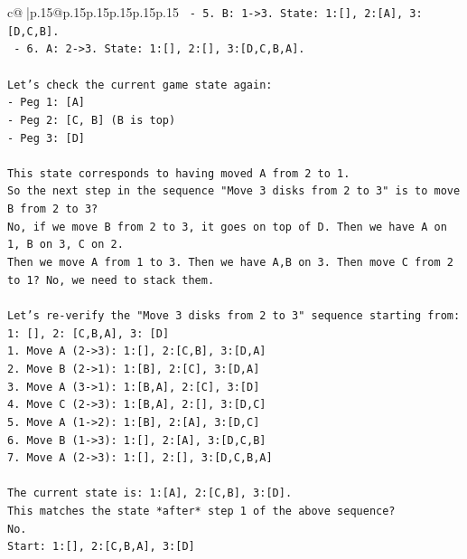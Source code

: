 \documentclass{article}
\begin{document}
{\begin{supertabular}{c@{$\;$}|p{.15\linewidth}@{}p{.15\linewidth}p{.15\linewidth}p{.15\linewidth}p{.15\linewidth}p{.15\linewidth}}
{{{\texttt{   {-} 5. B: 1{-}>3. State: 1:{[}{]}, 2:{[}A{]}, 3:{[}D,C,B{]}.} \\
\texttt{   {-} 6. A: 2{-}>3. State: 1:{[}{]}, 2:{[}{]}, 3:{[}D,C,B,A{]}.} \\
\\ 
\texttt{Let's check the current game state again:} \\
\texttt{{-} Peg 1: {[}A{]}} \\
\texttt{{-} Peg 2: {[}C, B{]} (B is top)} \\
\texttt{{-} Peg 3: {[}D{]}} \\
\\ 
\texttt{This state corresponds to having moved A from 2 to 1.} \\
\texttt{So the next step in the sequence "Move 3 disks from 2 to 3" is to move B from 2 to 3?} \\
\texttt{No, if we move B from 2 to 3, it goes on top of D. Then we have A on 1, B on 3, C on 2.} \\
\texttt{Then we move A from 1 to 3. Then we have A,B on 3. Then move C from 2 to 1? No, we need to stack them.} \\
\\ 
\texttt{Let's re{-}verify the "Move 3 disks from 2 to 3" sequence starting from:} \\
\texttt{1: {[}{]}, 2: {[}C,B,A{]}, 3: {[}D{]}} \\
\texttt{1. Move A (2{-}>3): 1:{[}{]}, 2:{[}C,B{]}, 3:{[}D,A{]}} \\
\texttt{2. Move B (2{-}>1): 1:{[}B{]}, 2:{[}C{]}, 3:{[}D,A{]}} \\
\texttt{3. Move A (3{-}>1): 1:{[}B,A{]}, 2:{[}C{]}, 3:{[}D{]}} \\
\texttt{4. Move C (2{-}>3): 1:{[}B,A{]}, 2:{[}{]}, 3:{[}D,C{]}} \\
\texttt{5. Move A (1{-}>2): 1:{[}B{]}, 2:{[}A{]}, 3:{[}D,C{]}} \\
\texttt{6. Move B (1{-}>3): 1:{[}{]}, 2:{[}A{]}, 3:{[}D,C,B{]}} \\
\texttt{7. Move A (2{-}>3): 1:{[}{]}, 2:{[}{]}, 3:{[}D,C,B,A{]}} \\
\\ 
\texttt{The current state is: 1:{[}A{]}, 2:{[}C,B{]}, 3:{[}D{]}.} \\
\texttt{This matches the state *after* step 1 of the above sequence?} \\
\texttt{No.} \\
\texttt{Start: 1:{[}{]}, 2:{[}C,B,A{]}, 3:{[}D{]}} \\
}}}
\end{supertabular}}
\end{document}
